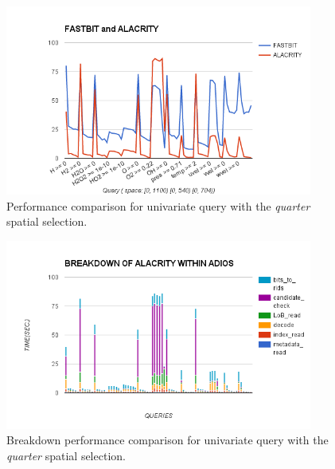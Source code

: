 \documentclass[11pt,a4paper]{article}
\begin{document}
\begin{figure}[ht]             
\begin{center}                 
    \includegraphics[width=0.90\textwidth]{figures/perf/alac-adios/uniquery-quarter-space}
\end{center}
\caption{Performance comparison for univariate query with the \emph{quarter} spatial selection.}
\label{fig:uniquery-quarter}  
\end{figure}


\begin{figure}[ht]             
\begin{center}                 
    \includegraphics[width=0.90\textwidth]{figures/perf/alac-adios/breakdown-uniquery-quarter-space}
\end{center}
\caption{Breakdown performance comparison for univariate query with the \emph{quarter} spatial selection.}
\label{fig:uniquery-quarter-breakdown}  
\end{figure}
\end{document}

